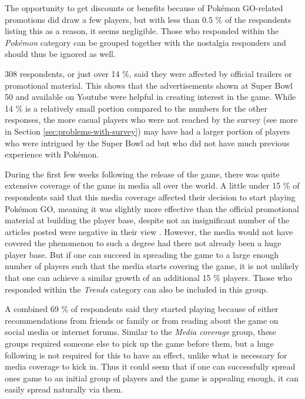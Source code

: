 The opportunity to get discounts or benefits because of Pokémon GO-related promotions did draw a few players, but with less than 0.5 \% of the respondents listing this as a reason, it seems negligible. Those who responded within the \emph{Pokémon} category can be grouped together with the nostalgia responders and should thus be ignored as well.

308 respondents, or just over 14 \%, said they were affected by official trailers or promotional material. This shows that the advertisements shown at Super Bowl 50 and available on Youtube were helpful in creating interest in the game. While 14 \% is a relatively small portion compared to the numbers for the other responses, the more casual players who were not reached by the survey (see more in Section \ref{sec:problems-with-survey}) may have had a larger portion of players who were intrigued by the Super Bowl ad but who did not have much previous experience with Pokémon.

\begin{figure}[h]
	\centering
	\caption{}
\end{figure}

During the first few weeks following the release of the game, there was quite extensive coverage of the game in media all over the world. A little under 15 \% of respondents said that this media coverage affected their decision to start playing Pokémon GO, meaning it was slightly more effective than the official promotional material at building the player base, despite not an insignificant number of the articles posted were negative in their view . However, the media would not have covered the phenomenon to such a degree had there not already been a huge player base. But if one can succeed in spreading the game to a large enough number of players such that the media starts covering the game, it is not unlikely that one can achieve a similar growth of an additional 15 \% players. Those who responded within the \emph{Trends} category can also be included in this group.

A combined 69 \% of respondents said they started playing because of either recommendations from friends or family or from reading about the game on social media or internet forums. Similar to the \emph{Media coverage} group, these groups required someone else to pick up the game before them, but a huge following is not required for this to have an effect, unlike what is necessary for media coverage to kick in. Thus it could seem that if one can successfully spread ones game to an initial group of players and the game is appealing enough, it can easily spread naturally via them.

